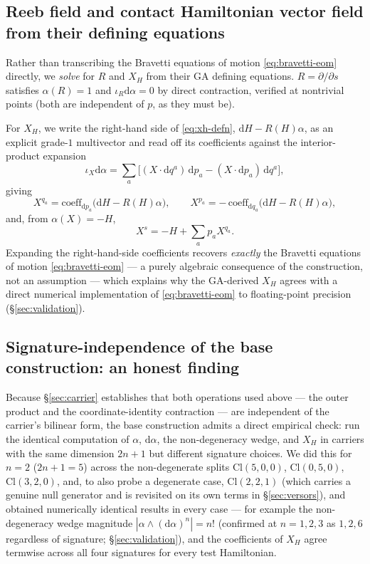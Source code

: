\documentclass[11pt]{article}
\newcommand{\Cl}{\mathrm{Cl}}
\newcommand{\dif}{\mathrm{d}}
\begin{document}
\subsection{Reeb field and contact Hamiltonian vector field from their defining equations}

Rather than transcribing the Bravetti equations of motion \eqref{eq:bravetti-eom} directly, we \emph{solve} for $R$ and $X_H$ from their GA defining equations. $R=\partial/\partial s$ satisfies $\alpha(R)=1$ and $\iota_R\dif\alpha=0$ by direct contraction, verified at nontrivial points (both are independent of $p$, as they must be).

For $X_H$, we write the right-hand side of \eqref{eq:xh-defn}, $\dif H - R(H)\alpha$, as an explicit grade-$1$ multivector and read off its coefficients against the interior-product expansion
\begin{equation}
\iota_X\dif\alpha = \sum_a\Big[(X\cdot \dif q^a)\,\dif p_a - (X\cdot \dif p_a)\,\dif q^a\Big],
\end{equation}
giving
\begin{equation}
X^{q_a} = \mathrm{coeff}_{\dif p_a}\big(\dif H - R(H)\alpha\big), \qquad
X^{p_a} = -\,\mathrm{coeff}_{\dif q_a}\big(\dif H - R(H)\alpha\big),
\end{equation}
and, from $\alpha(X)=-H$,
\begin{equation}
X^s = -H + \sum_a p_a X^{q_a}.
\end{equation}
Expanding the right-hand-side coefficients recovers \emph{exactly} the Bravetti equations of motion \eqref{eq:bravetti-eom} — a purely algebraic consequence of the construction, not an assumption — which explains why the GA-derived $X_H$ agrees with a direct numerical implementation of \eqref{eq:bravetti-eom} to floating-point precision (\S\ref{sec:validation}).

\subsection{Signature-independence of the base construction: an honest finding}
\label{sec:signature-independence}

Because \S\ref{sec:carrier} establishes that both operations used above — the outer product and the coordinate-identity contraction — are independent of the carrier's bilinear form, the base construction admits a direct empirical check: run the identical computation of $\alpha$, $\dif\alpha$, the non-degeneracy wedge, and $X_H$ in carriers with the same dimension $2n+1$ but different signature choices. We did this for $n=2$ ($2n+1=5$) across the non-degenerate splits $\Cl(5,0,0)$, $\Cl(0,5,0)$, $\Cl(3,2,0)$, and, to also probe a degenerate case, $\Cl(2,2,1)$ (which carries a genuine null generator and is revisited on its own terms in \S\ref{sec:versors}), and obtained numerically identical results in every case — for example the non-degeneracy wedge magnitude $|\alpha\wedge(\dif\alpha)^n|=n!$ (confirmed at $n=1,2,3$ as $1,2,6$ regardless of signature; \S\ref{sec:validation}), and the coefficients of $X_H$ agree termwise across all four signatures for every test Hamiltonian.
\end{document}
